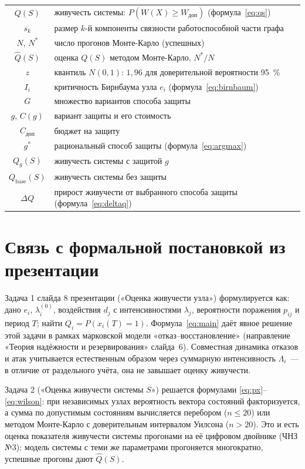 \documentclass[12pt]{article}
\begin{document}
\begin{center}
\begin{tabular}{|c|l|}
$Q(S)$ & живучесть системы: $P(W(X) \geq W_{\text{доп}})$ (формула~\eqref{eq:qs}) \\
$s_k$ & размер $k$-й компоненты связности работоспособной части графа \\
$N$, $N^{*}$ & число прогонов Монте-Карло (успешных) \\
$\hat{Q}(S)$ & оценка $Q(S)$ методом Монте-Карло, $N^{*}/N$ \\
$z$ & квантиль $N(0, 1)$: $1{,}96$ для доверительной вероятности 95~\% \\
$I_i$ & критичность Бирнбаума узла $e_i$ (формула~\eqref{eq:birnbaum}) \\
$G$ & множество вариантов способа защиты \\
$g$, $C(g)$ & вариант защиты и его стоимость \\
$C_{\text{доп}}$ & бюджет на защиту \\
$g^{*}$ & рациональный способ защиты (формула~\eqref{eq:argmax}) \\
$Q_g(S)$ & живучесть системы с защитой $g$ \\
$Q_{\text{base}}(S)$ & живучесть системы без защиты \\
$\Delta Q$ & прирост живучести от выбранного способа защиты (формула~\eqref{eq:deltaq}) \\
\hline
\end{tabular}
\end{center}

\section{Связь с формальной постановкой из презентации}

Задача 1 слайда 8 презентации («Оценка живучести узла») формулируется как:
дано $e_i$, $\lambda_i^{(0)}$, воздействия $d_j$ с интенсивностями $\lambda_j$,
вероятности поражения $p_{ij}$ и период $T$; найти
$Q_i = P(x_i(T) = 1)$. Формула~\eqref{eq:main} даёт явное решение этой задачи
в рамках марковской модели «отказ--восстановление» (направление «Теория
надёжности и резервирования» слайда~6). Совместная динамика отказов и атак
учитывается естественным образом через суммарную интенсивность
$\Lambda_i$~--- в отличие от раздельного учёта, она не завышает оценку
живучести.

Задача 2 («Оценка живучести системы $S$») решается формулами
\eqref{eq:px}--\eqref{eq:wilson}: при независимых узлах вероятность вектора
состояний факторизуется, а сумма по допустимым состояниям вычисляется
перебором ($n \leq 20$) или методом Монте-Карло с доверительным интервалом
Уилсона ($n > 20$). Это и есть оценка показателя живучести системы
прогонами на её цифровом двойнике (ЧНЗ №3): модель системы с теми же
параметрами прогоняется многократно, успешные прогоны дают $\hat{Q}(S)$.
\end{document}
